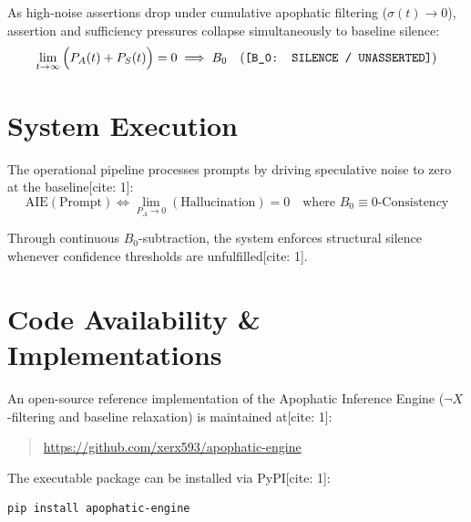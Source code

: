 \documentclass[master_monograph.tex]{subfiles}
\begin{document}
\begin{theorem}
As high-noise assertions drop under cumulative apophatic filtering ($\sigma(t) \to 0$), assertion and sufficiency pressures collapse simultaneously to baseline silence:
\begin{equation}
\lim_{t \to \infty} \Big( P_A(t) + P_S(t) \Big) = 0 \implies B_0 \quad \text{(\texttt{[B\_0: SILENCE / UNASSERTED]})}
\end{equation}
\end{theorem}

\section{System Execution}
The operational pipeline processes prompts by driving speculative noise to zero at the baseline[cite: 1]:
\begin{equation}
\text{AIE}(\text{Prompt}) \iff \lim_{P_A \to 0} (\text{Hallucination}) = 0 \quad \text{where } B_0 \equiv \text{0-Consistency}
\end{equation}

Through continuous $B_0$-subtraction, the system enforces structural silence whenever confidence thresholds are unfulfilled[cite: 1].

\section{Code Availability \& Implementations}
An open-source reference implementation of the Apophatic Inference Engine ($\neg X$-filtering and baseline relaxation) is maintained at[cite: 1]:
\begin{quote}
\url{https://github.com/xerx593/apophatic-engine}
\end{quote}
The executable package can be installed via PyPI[cite: 1]:
\begin{verbatim}
pip install apophatic-engine
\end{verbatim}
\end{document}
